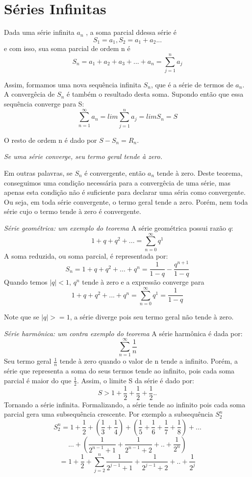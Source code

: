 \documentclass[12pt]{article}
\begin{document}
    \section{Séries Infinitas}
    Dada uma série infinita $a_n$ , a soma parcial ddessa série é
    \[S_1 = a_1,  S_2 = a_1 + a_2 ...\]
    e com isso, sua soma parcial de ordem n é
    \[S_n = a_1 + a_2 + a_3 + ... + a_n = \sum_{j = 1}^{n} a_j \]

    Assim, formamos uma nova sequência infinita $S_n$, que é a série de termos de $a_n$.
    A convergêcia de $S_n$ é também o resultado desta soma. Supondo então que essa sequência converge para S:
    \[ \sum_{n = 1}^{\infty} a_n  = lim \sum_{j = 1}^{n} a_j  = lim S_n = S\]

    O resto de ordem n é dado por $S - S_n = R_n$.

   \emph{Se uma série converge, seu termo geral tende à zero.}

    Em outras palavras, se $S_n$ é  convergente, então $a_n$ tende à zero. Deste teorema,
    conseguimos uma condição necessária para a convergêcia de uma série, mas apenas esta 
    condição não é suficiente para declarar uma séria como convergente. Ou seja, em toda série
    convergente, o termo geral tende a zero. Porém, nem toda série cujo o termo tende à zero é convergente.

    \emph{Série geométrica: um exemplo do teorema}
    A série geométrica possui razão $q$:
    \[ 1 + q + q^2 + ... = \sum_{n=0}^{\infty} q^1\] 
    A soma reduzida, ou soma parcial, é representada por:
    \[ S_n = 1 +  q + q^2 + ... + q^n = \frac{1}{1-q} - \frac{q^{n+1}}{1-q}\] 
    Quando temos $|q| < 1$, $q^n$ tende à zero e a expressão converge para 
    \[ 1 +  q + q^2 + ... + q^n = \sum_{n=0}^{\infty} q^1 = \frac{1}{1-q}\] 

    Note que se $|q| >= 1$, a série diverge pois seu termo geral não tende à zero.

    \emph{Série harmônica: um contra exemplo do teorema}
    A série harmônica é dada por:
    \[\sum_{n=1}^{\infty} \frac{1}{n}\] 
    Seu termo geral $\frac{1}{n}$ tende à zero quando o valor de n tende a infinito. 
    Porém, a série que representa a soma do seus termos tende ao infinito, pois cada soma parcial
    é maior do que $\frac{1}{2}$. Assim, o limite S da série é dado por:
    \[ S > 1 + \frac{1}{2} + \frac{1}{2} + \frac{1}{2} ..\] 
    Tornando a série infinita.
    Formalizando, a série tende ao infinito pois cada soma parcial gera uma subsequência crescente. Por exemplo
    a subsequência $S_2^n$
    \[ S_2^n = 1 + \frac{1}{2} + (\frac{1}{3} + \frac{1}{4}) + (\frac{1}{5} + \frac{1}{6} +\frac{1}{7} + \frac{1}{8}) + ... \] 
    \[ ... + (\frac{1}{2^{n-1} + 1} + \frac{1}{2^{n-1} + 2} + .. + \frac{1}{2^n})\] 
    \[ =  1 + \frac{1}{2} + \sum_{j = 2}^{n} \frac{1}{2^{j-1} + 1} + \frac{1}{2^{j-1} + 2} + .. + \frac{1}{2^j}\] 
    
\end{document}
